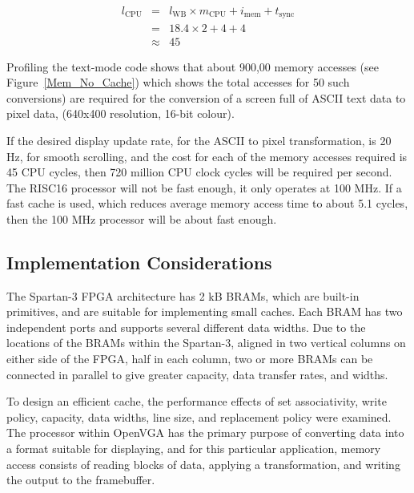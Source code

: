 \begin{eqnarray*}
l_\mathrm{CPU}	& = & l_\mathrm{WB} \times m_\mathrm{CPU} + i_\mathrm{mem} +
t_\mathrm{sync} \\
				& = & 18.4 \times 2 + 4 + 4 \\
				& \approx & 45
\end{eqnarray*}

Profiling the text-mode code shows that about 900,00 memory accesses (see
Figure~\ref{Mem_No_Cache}) which shows the total accesses for 50 such
conversions) are required for the conversion of a screen full of ASCII text data
to pixel data, (640x400 resolution, 16-bit colour).

If the desired display update rate, for the ASCII to pixel transformation, is 20
Hz, for smooth scrolling, and the cost for each of the memory accesses required
is 45 CPU cycles, then 720 million CPU clock cycles will be required per second.
The RISC16 processor will not be fast enough, it only operates at 100 MHz. If a
fast cache is used, which reduces average memory access time to about 5.1 cycles,
then the 100 MHz processor will be about fast enough.

% 

\subsection{Implementation Considerations}
The Spartan-3 FPGA architecture has 2 kB BRAMs, which are built-in primitives,
and are suitable for implementing small caches. Each BRAM has two independent
ports and supports several different data widths. Due to the locations of the
BRAMs within the Spartan-3, aligned in two vertical columns on either side of the
FPGA, half in each column, two or more BRAMs can be connected in parallel to give
greater capacity, data transfer rates, and widths.

To design an efficient cache, the performance effects of set associativity, write
policy, capacity, data widths, line size, and replacement policy were examined.
The processor within OpenVGA has the primary purpose of converting data into a
format suitable for displaying, and for this particular application, memory
access consists of reading blocks of data, applying a transformation, and writing
the output to the framebuffer.

